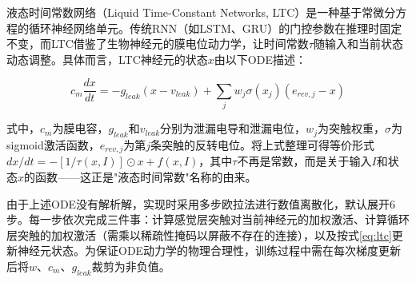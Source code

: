 \xiaosi

液态时间常数网络（Liquid Time-Constant Networks, LTC）\cite{hasani2021ltc}是一种基于常微分方程的循环神经网络单元。传统RNN（如LSTM、GRU）的门控参数在推理时固定不变，而LTC借鉴了生物神经元的膜电位动力学，让时间常数$\tau$随输入和当前状态动态调整。具体而言，LTC神经元的状态$x$由以下ODE描述：

\begin{equation}
    c_m \frac{dx}{dt} = -g_{leak}(x - v_{leak}) + \sum_{j} w_j \sigma(x_j)(e_{rev,j} - x)
    \label{eq:ltc}
\end{equation}

式中，$c_m$为膜电容，$g_{leak}$和$v_{leak}$分别为泄漏电导和泄漏电位，$w_j$为突触权重，$\sigma$为sigmoid激活函数，$e_{rev,j}$为第$j$条突触的反转电位。将上式整理可得等价形式$dx/dt = -[1/\tau(x,I)] \odot x + f(x,I)$，其中$\tau$不再是常数，而是关于输入$I$和状态$x$的函数——这正是"液态时间常数"名称的由来。

由于上述ODE没有解析解，实现时采用多步欧拉法进行数值离散化，默认展开6步。每一步依次完成三件事：计算感觉层突触对当前神经元的加权激活、计算循环层突触的加权激活（需乘以稀疏性掩码以屏蔽不存在的连接），以及按式\ref{eq:ltc}更新神经元状态。为保证ODE动力学的物理合理性，训练过程中需在每次梯度更新后将$w$、$c_m$、$g_{leak}$裁剪为非负值。
